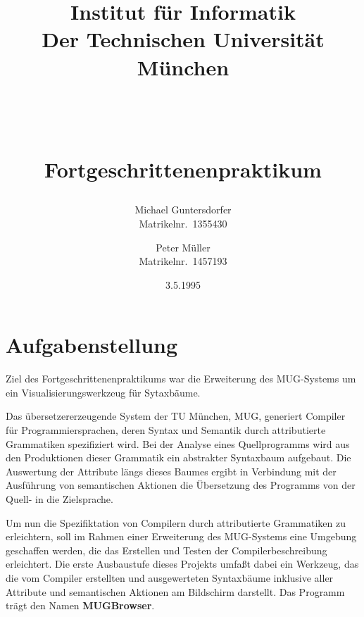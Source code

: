 
\pagestyle{headings}




\title{\thispagestyle{empty}
\parbox{2 cm}{ \abakus{2 cm}}
\parbox{9 cm}{
\begin{center}
{\Huge Institut f\"ur Informatik} \\
{\large Der Technischen Universit\"at M\"unchen} \\
{}
\end{center}}
\parbox{3 cm}{\oTUM{3 cm}}  \\
\vspace{4 cm}{\Huge MUGBrowser V1.0} \\
	     {\large Fortgeschrittenenpraktikum} \\
\vspace{1 cm}{\large Betreuung: R. H\"ollerer}
}
\author{Michael Guntersdorfer\\Matrikelnr.\ 1355430 \and Peter M\"uller\\Matrikelnr.\ 1457193}
\date{3.5.1995}
\maketitle

\tableofcontents
\newpage

\chapter{Aufgabenstellung}

Ziel des Fortgeschrittenenpraktikums war die Erweiterung des MUG-Systems um ein Visualisierungswerkzeug f\"ur Sytaxb\"aume.

Das \"ubersetzererzeugende System der TU M\"unchen, MUG, generiert Compiler f\"ur Programmiersprachen, deren Syntax und Semantik durch attributierte
Grammatiken spezifiziert wird. Bei der Analyse eines Quellprogramms wird aus den Produktionen dieser Grammatik ein abstrakter Syntaxbaum aufgebaut.
Die Auswertung der Attribute l\"angs dieses Baumes ergibt in Verbindung mit der Ausf\"uhrung von semantischen Aktionen die \"Ubersetzung des Programms
von der Quell- in die Zielsprache.

Um nun die Spezifiktation von Compilern durch attributierte Grammatiken zu erleichtern, soll im Rahmen einer Erweiterung des MUG-Systems eine Umgebung
geschaffen werden, die das Erstellen und Testen der Compilerbeschreibung erleichtert. Die erste Ausbaustufe dieses Projekts umfa\ss{}t dabei ein
Werkzeug, das die vom Compiler erstellten und ausgewerteten Syntaxb\"aume inklusive aller Attribute und semantischen Aktionen am Bildschirm darstellt.
Das Programm tr\"agt den Namen {\bf MUGBrowser}.

